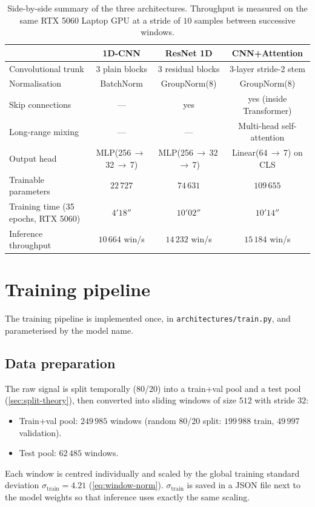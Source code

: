 \begin{table}[H]
    \centering
    \footnotesize
    \begin{tabular}{lccc}
        \toprule
        & \textbf{1D-CNN} & \textbf{ResNet 1D} & \textbf{CNN+Attention} \\
        \midrule
        Convolutional trunk         & 3 plain blocks & 3 residual blocks & 3-layer stride-2 stem \\
        Normalisation               & BatchNorm      & GroupNorm(8)      & GroupNorm(8) \\
        Skip connections            & ---            & yes               & yes (inside Transformer) \\
        Long-range mixing           & ---            & ---               & Multi-head self-attention \\
        Output head                 & MLP(256\,$\to$\,32\,$\to$\,7) & MLP(256\,$\to$\,32\,$\to$\,7) & Linear(64\,$\to$\,7) on CLS \\
        Trainable parameters        & $22\,727$      & $74\,631$         & $109\,655$ \\
        Training time (35 epochs, RTX 5060) & $4'18''$ & $10'02''$         & $10'14''$ \\
        Inference throughput        & $10\,664$ win/s & $14\,232$ win/s   & $15\,184$ win/s \\
        \bottomrule
    \end{tabular}
    \caption{Side-by-side summary of the three architectures.
    Throughput is measured on the same RTX 5060 Laptop GPU at a stride
    of $10$ samples between successive windows.}
    \label{tab:archi-compare}
\end{table}

\section{Training pipeline}
\label{sec:archi-train}

The training pipeline is implemented once, in
\texttt{architectures/train.py}, and parameterised by the model name.

\subsection{Data preparation}

The raw signal is split temporally (80/20) into a train+val pool and a
test pool (\cref{sec:split-theory}), then converted into sliding
windows of size $512$ with stride $32$:
\begin{itemize}[leftmargin=*, itemsep=0.2em]
    \item Train+val pool: $249\,985$ windows
    (random 80/20 split: $199\,988$ train, $49\,997$ validation).
    \item Test pool: $62\,485$ windows.
\end{itemize}
Each window is centred individually and scaled by the global training
standard deviation $\sigma_{\text{train}} = 4.21$
(\cref{eq:window-norm}). $\sigma_{\text{train}}$ is saved in a JSON file
next to the model weights so that inference uses exactly the same
scaling.

